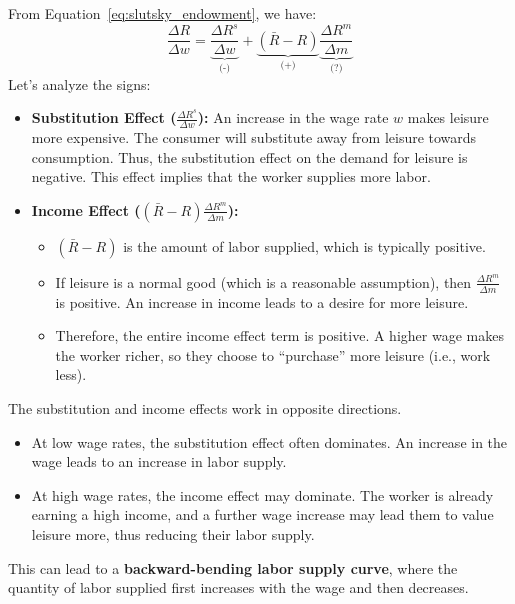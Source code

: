 From Equation~\eqref{eq:slutsky_endowment}, we have:
\begin{equation}
\frac{\Delta R}{\Delta w} = \underbrace{\frac{\Delta R^s}{\Delta w}}_{\text{(-)}} + \underbrace{(\bar{R} - R)}_{\text{(+)}} \underbrace{\frac{\Delta R^m}{\Delta m}}_{\text{(?)}}
\label{eq:slutsky_labor}
\end{equation}
Let's analyze the signs:
\begin{itemize}
    \item \textbf{Substitution Effect ($\frac{\Delta R^s}{\Delta w}$):} An increase in the wage rate $w$ makes leisure more expensive. The consumer will substitute away from leisure towards consumption. Thus, the substitution effect on the demand for leisure is negative. This effect implies that the worker supplies more labor.
    \item \textbf{Income Effect ($(\bar{R} - R)\frac{\Delta R^m}{\Delta m}$):}
        \begin{itemize}
            \item $(\bar{R} - R)$ is the amount of labor supplied, which is typically positive.
            \item If leisure is a normal good (which is a reasonable assumption), then $\frac{\Delta R^m}{\Delta m}$ is positive. An increase in income leads to a desire for more leisure.
            \item Therefore, the entire income effect term is positive. A higher wage makes the worker richer, so they choose to ``purchase'' more leisure (i.e., work less).
        \end{itemize}
\end{itemize}

The substitution and income effects work in opposite directions.
\begin{itemize}
    \item At low wage rates, the substitution effect often dominates. An increase in the wage leads to an increase in labor supply.
    \item At high wage rates, the income effect may dominate. The worker is already earning a high income, and a further wage increase may lead them to value leisure more, thus reducing their labor supply.
\end{itemize}
This can lead to a \textbf{backward-bending labor supply curve}, where the quantity of labor supplied first increases with the wage and then decreases.


